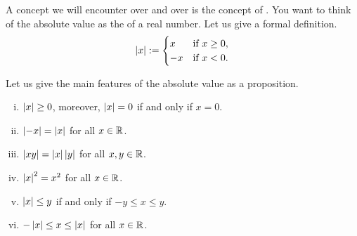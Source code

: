 
A concept we will encounter over and over is the concept of
\emph{}.
You want to think of the absolute value as the  of a real number.
Let us give a formal definition.
\begin{equation*}
\left\lvert {x} \right\rvert :=
\begin{cases}
x & \text{if } x \geq 0, \\
-x & \text{if } x < 0 .
\end{cases}
\end{equation*}

Let us give the main features of the absolute
value as a proposition.

\begin{prop} \label{prop:absbas}
\leavevmode
\begin{enumerate}[(i)]
\item \label{prop:absbas:i} $\left\lvert {x} \right\rvert \geq 0$, moreover, $\left\lvert {x} \right\rvert=0$ if and only if $x = 0$.
\item \label{prop:absbas:ii} $\left\lvert {-x} \right\rvert = \left\lvert {x} \right\rvert$ for all $x \in {\mathbb{R}}$.
\item \label{prop:absbas:iii} $\left\lvert {xy} \right\rvert = \left\lvert {x} \right\rvert\left\lvert {y} \right\rvert$ for all $x,y \in {\mathbb{R}}$.
\item \label{prop:absbas:iv} $\left\lvert {x} \right\rvert^2 = x^2$ for all $x \in {\mathbb{R}}$.
\item \label{prop:absbas:v} $\left\lvert {x} \right\rvert \leq y$ if and only if $-y \leq x \leq y$.
\item \label{prop:absbas:vi} $-\left\lvert {x} \right\rvert \leq x \leq \left\lvert {x} \right\rvert$ for all $x \in {\mathbb{R}}$.
\end{enumerate}
\end{prop}

